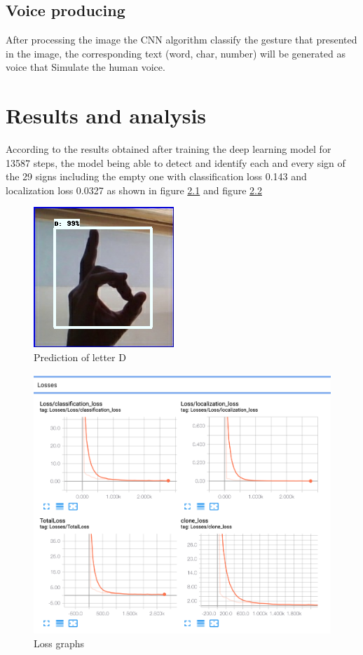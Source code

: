\documentclass[12pt]{report}
\begin{document}
\newpage
\section{Voice producing}
After processing the image the CNN algorithm classify the gesture
that presented in the image, the corresponding text (word, char, number)
will be generated as voice that Simulate the human voice. 


\chapter{Results and analysis}
According to the results obtained after training the deep learning model for 13587 steps,
the model being able to detect and identify each and every sign of the 29 signs including 
the empty one with classification loss 0.143 and localization loss 0.0327
as shown in figure \ref{fig:d_eval} and figure \ref{fig:loss}
\bigbreak

\begin{figure}[h]
    \centering
    \includegraphics[width=.6\textwidth]{./images/d_eval.png}
    \caption{Prediction of letter D}
    \label{fig:d_eval}
\end{figure} 

\begin{figure}
    \centering
    \includegraphics[width=\textwidth]{./images/loss.png}
    \caption{Loss graphs}
    \label{fig:loss}
\end{figure}
\end{document}
